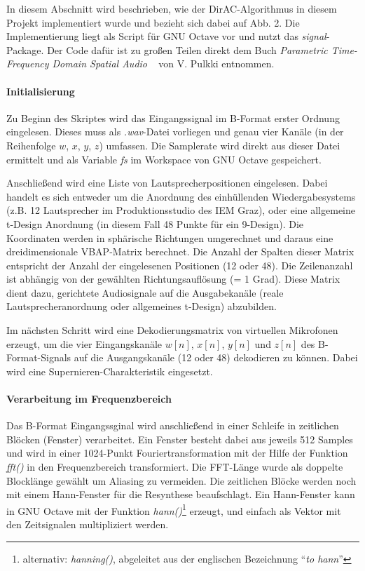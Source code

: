In diesem Abschnitt wird beschrieben, wie der DirAC-Algorithmus in diesem Projekt implementiert wurde und bezieht sich dabei auf Abb. 2. Die Implementierung liegt als Script für GNU Octave vor und nutzt das \textit{signal}-Package. Der Code dafür ist zu großen Teilen direkt dem Buch \textit{Parametric Time-Frequency Domain Spatial Audio} ~\cite{spatial-book} von V. Pulkki entnommen.

\paragraph{Initialisierung}
Zu Beginn des Skriptes wird das Eingangssignal im B-Format erster Ordnung eingelesen. Dieses muss als \textit{.wav}-Datei vorliegen und genau vier Kanäle (in der Reihenfolge $w$, $x$, $y$, $z$) umfassen. Die Samplerate wird direkt aus dieser Datei ermittelt und als Variable \textit{fs} im Workspace von GNU Octave gespeichert.

Anschließend wird eine Liste von Lautsprecherpositionen eingelesen. Dabei handelt es sich entweder um die Anordnung des einhüllenden Wiedergabesystems (z.B. 12 Lautsprecher im Produktionsstudio des IEM Graz), oder eine allgemeine t-Design Anordnung (in diesem Fall 48 Punkte für ein 9-Design). Die Koordinaten werden in sphärische Richtungen umgerechnet und daraus eine dreidimensionale VBAP-Matrix berechnet. Die Anzahl der Spalten dieser Matrix entspricht der Anzahl der eingelesenen Positionen (12 oder 48). Die Zeilenanzahl ist abhängig von der gewählten Richtungsauflösung (= 1 Grad). Diese Matrix dient dazu, gerichtete Audiosignale auf die Ausgabekanäle (reale Lautsprecheranordnung oder allgemeines t-Design) abzubilden.

Im nächsten Schritt wird eine Dekodierungsmatrix von virtuellen Mikrofonen erzeugt, um die vier Eingangskanäle $w[n]$, $x[n]$, $y[n]$ und $z[n]$ des B-Format-Signals auf die Ausgangskanäle (12 oder 48) dekodieren zu können. Dabei wird eine Supernieren-Charakteristik eingesetzt.

\paragraph{Verarbeitung im Frequenzbereich}
Das B-Format Eingangssginal wird anschließend in einer Schleife in zeitlichen Blöcken (Fenster) verarbeitet. Ein Fenster besteht dabei aus jeweils 512 Samples und wird in einer 1024-Punkt Fouriertransformation mit der Hilfe der Funktion \textit{fft()} in den Frequenzbereich transformiert. Die FFT-Länge wurde als doppelte Blocklänge gewählt um Aliasing zu vermeiden. Die zeitlichen Blöcke werden noch mit einem Hann-Fenster für die Resynthese beaufschlagt. Ein Hann-Fenster kann in GNU Octave mit der Funktion \textit{hann()}\footnote{alternativ: \textit{hanning()}, abgeleitet aus der englischen Bezeichnung ``\textit{to hann}''} erzeugt, und einfach als Vektor mit den Zeitsignalen multipliziert werden.